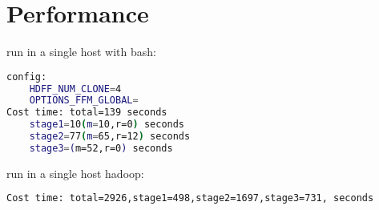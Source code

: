 \section{Performance}


run in a single host with bash:

\begin{lstlisting}[language=bash]
config:
    HDFF_NUM_CLONE=4
    OPTIONS_FFM_GLOBAL=
Cost time: total=139 seconds
    stage1=10(m=10,r=0) seconds
    stage2=77(m=65,r=12) seconds
    stage3=(m=52,r=0) seconds
\end{lstlisting}


run in a single host hadoop:
\begin{lstlisting}[language=bash]
Cost time: total=2926,stage1=498,stage2=1697,stage3=731, seconds
\end{lstlisting}



